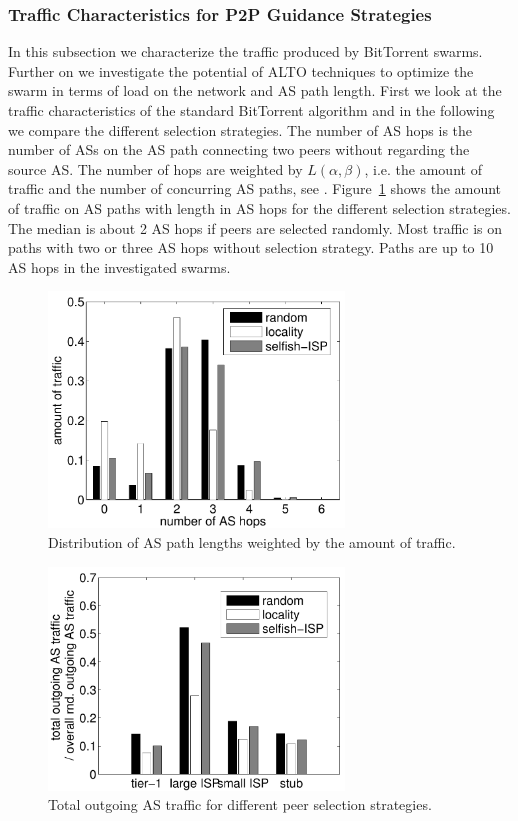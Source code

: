 \subsubsection{Traffic Characteristics for P2P Guidance Strategies}
In this subsection we characterize the traffic produced by BitTorrent swarms. Further on we investigate the potential of ALTO techniques to optimize the swarm in terms of load on the network and AS path length.
First we look at the traffic characteristics of the standard BitTorrent algorithm and in the following we compare the different selection strategies.
The number of AS hops is the number of ASs on the AS path connecting two peers without regarding the source AS. The number of hops are weighted by $L(\alpha,\beta)$, i.e. the amount of traffic and the number of concurring AS paths, see . Figure~\ref{fig:CDF_hops} shows the amount of traffic on AS paths with length in AS hops for the different selection strategies. The median is about 2 AS hops if peers are selected randomly. Most traffic is on paths with two or three AS hops without selection strategy. Paths are up to 10 AS hops in the investigated swarms.

\begin{figure}[bt]
	\centering
	\includegraphics[width=0.7\textwidth]{aslevel/p2p/results/figs/hops}
 	\caption{Distribution of AS path lengths weighted by the amount of traffic.}
 	\label{fig:CDF_hops}
\end{figure}

\begin{figure}[bt]
	\centering
	\includegraphics[width=0.7\textwidth]{aslevel/p2p/results/figs/outgoing}
 	\caption{Total outgoing AS traffic for different peer selection strategies.}
 	\label{fig:outgoing}
\end{figure}

